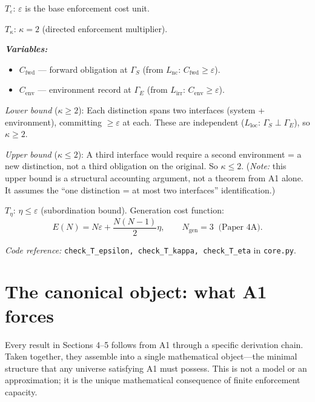 \documentclass[11pt]{article}
\newenvironment{varlist}{\begin{itemize}[nosep,leftmargin=2em]}{\end{itemize}}
\newcommand{\coderef}[2]{\smallskip\noindent\textit{Code reference:} \texttt{#1} in \texttt{#2}.}
\begin{document}
\begin{tcolorbox}[apfbox, title={$T_\varepsilon$, $T_\kappa$, $T_\eta$: Enforcement Granularity Parameters}]
\textit{$T_\varepsilon$}: $\varepsilon$ is the base enforcement cost unit.

\smallskip
\textit{$T_\kappa$}: $\kappa = 2$ (directed enforcement multiplier).

\smallskip\noindent\textbf{\textit{Variables:}}
\begin{varlist}
\item $C_{\mathrm{fwd}}$ --- forward obligation at $\Gamma_S$ (from $L_{\mathrm{nc}}$: $C_{\mathrm{fwd}} \ge \varepsilon$).
\item $C_{\mathrm{env}}$ --- environment record at $\Gamma_E$ (from $L_{\mathrm{irr}}$: $C_{\mathrm{env}} \ge \varepsilon$).
\end{varlist}

\textit{Lower bound} ($\kappa \ge 2$): Each distinction spans two interfaces (system + environment), committing $\ge \varepsilon$ at each.  These are independent ($L_{\mathrm{loc}}$: $\Gamma_S \perp \Gamma_E$), so $\kappa \ge 2$.

\textit{Upper bound} ($\kappa \le 2$): A third interface would require a second environment = a new distinction, not a third obligation on the original.  So $\kappa \le 2$.  (\textit{Note:} this upper bound is a structural accounting argument, not a theorem from A1 alone.  It assumes the ``one distinction = at most two interfaces'' identification.)

\smallskip
\textit{$T_\eta$}: $\eta \le \varepsilon$ (subordination bound).  Generation cost function:
\begin{equation}
E(N) = N\varepsilon + \frac{N(N-1)}{2}\eta, \qquad N_{\mathrm{gen}} = 3 \;\;\text{(Paper~4A)}.
\end{equation}

\coderef{check\_T\_epsilon, check\_T\_kappa, check\_T\_eta}{core.py}
\end{tcolorbox}


\section{The canonical object: what A1 forces}

Every result in Sections 4--5 follows from A1 through a specific derivation chain.  Taken together, they assemble into a single mathematical object---the minimal structure that any universe satisfying A1 must possess.  This is not a model or an approximation; it is the unique mathematical consequence of finite enforcement capacity.
\end{document}
